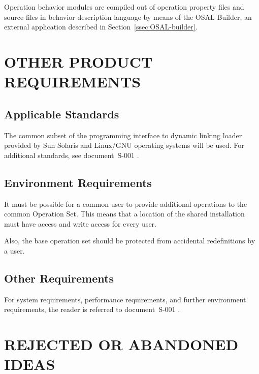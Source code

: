 \documentclass[twoside]{tce}
\begin{document}
Operation behavior modules are compiled out of operation property files and
source files in behavior description language by means of the OSAL Builder,
an external application described in Section~\ref{ssec:OSAL-builder}.



\chapter{OTHER PRODUCT REQUIREMENTS}

\section{Applicable Standards}

The common subset of the programming interface to dynamic linking loader
provided by Sun Solaris and Linux/GNU operating systems will be used.
%
For additional standards, see document~S-001 \cite{ProjectPlan}.

\section{Environment Requirements}



It must be possible for a common user to provide additional operations to
the common Operation Set. This means that a location of the shared
installation must have access and write access for every user.

Also, the base operation set should be protected from accidental
redefinitions by a user.

\section{Other Requirements}

For system requirements, performance requirements, and further environment
requirements, the reader is referred to document~S-001 \cite{ProjectPlan}.

\chapter{REJECTED OR ABANDONED IDEAS}
\end{document}
